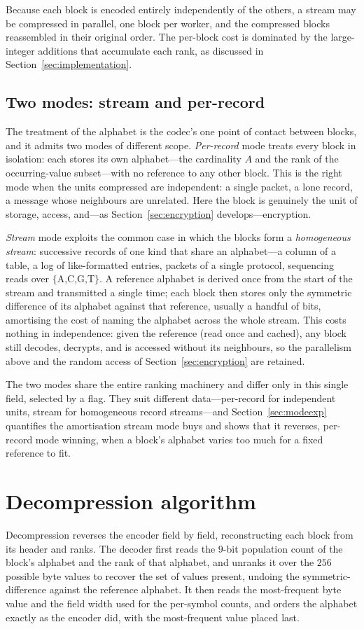 \documentclass[entropy,article,submit,oneauthor,pdftex]{Definitions/mdpi}
\begin{document}
Because each block is encoded entirely independently of the others, a stream may
be compressed in parallel, one block per worker, and the compressed blocks
reassembled in their original order. The per-block cost is dominated by the
large-integer additions that accumulate each rank, as discussed in
Section~\ref{sec:implementation}.

\subsection{Two modes: stream and per-record}\label{sec:modes}
The treatment of the alphabet is the codec's one point of contact between blocks,
and it admits two modes of different scope. \emph{Per-record} mode treats every
block in isolation: each stores its own alphabet---the cardinality $A$ and the rank
of the occurring-value subset---with no reference to any other block. This is the
right mode when the units compressed are independent: a single packet, a lone
record, a message whose neighbours are unrelated. Here the block is genuinely the
unit of storage, access, and---as Section~\ref{sec:encryption} develops---encryption.

\emph{Stream} mode exploits the common case in which the blocks form a
\emph{homogeneous stream}: successive records of one kind that share an alphabet---a
column of a table, a log of like-formatted entries, packets of a single protocol,
sequencing reads over $\{$A,C,G,T$\}$. A reference alphabet is derived once from the
start of the stream and transmitted a single time; each block then stores only the
symmetric difference of its alphabet against that reference, usually a handful of
bits, amortising the cost of naming the alphabet across the whole stream. This costs
nothing in independence: given the reference (read once and cached), any block still
decodes, decrypts, and is accessed without its neighbours, so the parallelism above
and the random access of Section~\ref{sec:encryption} are retained.

The two modes share the entire ranking machinery and differ only in this single
field, selected by a flag. They suit different data---per-record for independent
units, stream for homogeneous record streams---and Section~\ref{sec:modeexp}
quantifies the amortisation stream mode buys and shows that it reverses, per-record
mode winning, when a block's alphabet varies too much for a fixed reference to fit.
\section{Decompression algorithm}\label{sec:decompression-algorithm}
Decompression reverses the encoder field by field, reconstructing each block
from its header and ranks. The decoder first reads the $9$-bit population count
of the block's alphabet and the rank of that alphabet, and unranks it over the
$256$ possible byte values to recover the set of values present, undoing the
symmetric-difference against the reference alphabet. It then reads the most-frequent byte
value and the field width used for the per-symbol counts, and orders the alphabet
exactly as the encoder did, with the most-frequent value placed last.
\end{document}
